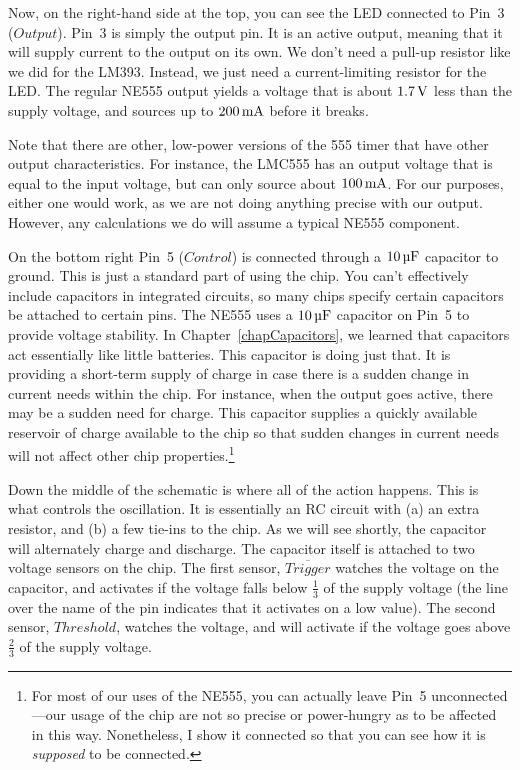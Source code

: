 Now, on the right-hand side at the top, you can see the LED connected to Pin~3 ($Output$).
Pin~3 is simply the output pin.
It is an active output, meaning that it will supply current to the output on its own.  
We don't need a pull-up resistor like we did for the LM393.
Instead, we just need a current-limiting resistor for the LED.
The regular NE555 output yields a voltage that is about $1.7\,\si{\volt}$ less than the supply voltage, and sources up to $200\,\si{\milli\ampere}$ before it breaks.

Note that there are other, low-power versions of the 555 timer that have other output characteristics.
For instance, the LMC555 has an output voltage that is equal to the input voltage, but can only source about $100\,\si{\milli\ampere}$.
For our purposes, either one would work, as we are not doing anything precise with our output.
However, any calculations we do will assume a typical NE555 component.

On the bottom right Pin~5 ($Control$) is connected through a $10\,\si{\micro\farad}$ capacitor to ground.
This is just a standard part of using the chip. 
You can't effectively include capacitors in integrated circuits, so many chips specify certain capacitors be attached to certain pins.
The NE555 uses a $10\,\si{\micro\farad}$ capacitor on Pin~5 to provide voltage stability.
In Chapter~\ref{chapCapacitors}, we learned that capacitors act essentially like little batteries.
This capacitor is doing just that.
It is providing a short-term supply of charge in case there is a sudden change in current needs within the chip.
For instance, when the output goes active, there may be a sudden need for charge.
This capacitor supplies a quickly available reservoir of charge available to the chip so that sudden changes in current needs will not affect other chip properties.\footnote{For most of our uses of the NE555, you can actually leave Pin~5 unconnected---our usage of the chip are not so precise or power-hungry as to be affected in this way.  
Nonetheless, I show it connected so that you can see how it is \emph{supposed} to be connected.}

Down the middle of the schematic is where all of the action happens.
This is what controls the oscillation.
It is essentially an RC circuit with (a) an extra resistor, and (b) a few tie-ins to the chip.
As we will see shortly, the capacitor will alternately charge and discharge.
The capacitor itself is attached to two voltage sensors on the chip.
The first sensor, $\overline{Trigger}$ watches the voltage on the capacitor, and activates if the voltage falls below $\frac{1}{3}$ of the supply voltage (the line over the name of the pin indicates that it activates on a low value).
The second sensor, $Threshold$, watches the voltage, and will activate if the voltage goes above $\frac{2}{3}$ of the supply voltage.

